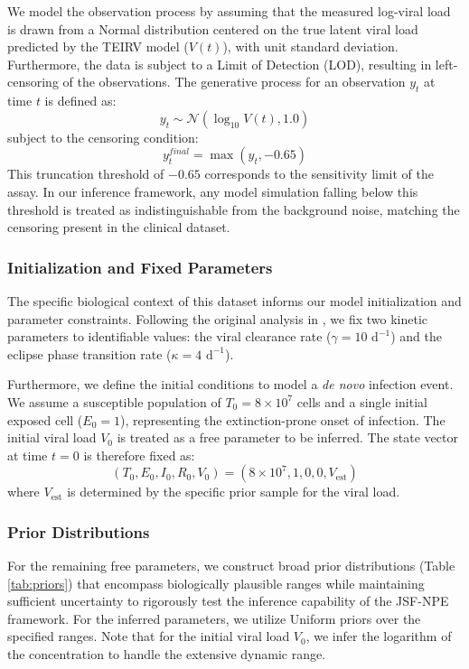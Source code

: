 \documentclass{article}
\begin{document}
We model the observation process by assuming that the measured log-viral load is drawn from a Normal distribution centered on the true latent viral load predicted by the TEIRV model ($V(t)$), with unit standard deviation. Furthermore, the data is subject to a Limit of Detection (LOD), resulting in left-censoring of the observations. The generative process for an observation $y_t$ at time $t$ is defined as:
\begin{equation}
    y_t \sim \mathcal{N}(\log_{10} V(t), 1.0)
\end{equation}
subject to the censoring condition:
\begin{equation}
    y_t^{final} = \max(y_t, -0.65)
\end{equation}
This truncation threshold of $-0.65$ corresponds to the sensitivity limit of the assay. In our inference framework, any model simulation falling below this threshold is treated as indistinguishable from the background noise, matching the censoring present in the clinical dataset.





\subsubsection{Initialization and Fixed Parameters}
The specific biological context of this dataset informs our model initialization and parameter constraints. Following the original analysis in \cite{Ke2022SarsData}, we fix two kinetic parameters to identifiable values: the viral clearance rate ($\gamma = 10 \text{ d}^{-1}$) and the eclipse phase transition rate ($\kappa = 4 \text{ d}^{-1}$). 

Furthermore, we define the initial conditions to model a \textit{de novo} infection event. We assume a susceptible population of $T_0 = 8 \times 10^7$ cells and a single initial exposed cell ($E_0 = 1$), representing the extinction-prone onset of infection. The initial viral load $V_0$ is treated as a free parameter to be inferred. The state vector at time $t=0$ is therefore fixed as:
\begin{equation}
    (T_0, E_0, I_0, R_0, V_0) = (8 \times 10^7, 1, 0, 0, V_{\text{est}})
\end{equation}
where $V_{\text{est}}$ is determined by the specific prior sample for the viral load.

\subsubsection{Prior Distributions}
For the remaining free parameters, we construct broad prior distributions (Table \ref{tab:priors}) that encompass biologically plausible ranges \cite{Perelson2002} while maintaining sufficient uncertainty to rigorously test the inference capability of the JSF-NPE framework. For the inferred parameters, we utilize Uniform priors over the specified ranges.  Note that for the initial viral load $V_0$, we infer the logarithm of the concentration to handle the extensive dynamic range.
\end{document}
